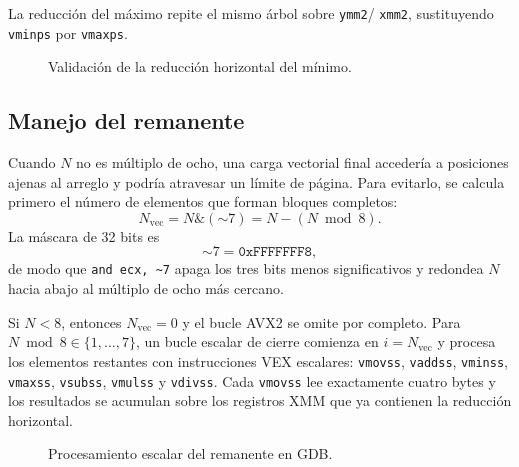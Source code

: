 \documentclass[journal]{IEEEtran}
\begin{document}
La reducción del máximo repite el mismo árbol sobre \texttt{ymm2}/
\texttt{xmm2}, sustituyendo \texttt{vminps} por \texttt{vmaxps}.

\begin{figure}[H]
  \centering
  \caption{Validación de la reducción horizontal del mínimo.}
  \label{fig:gdb-reduccion-min}
\end{figure}

\subsection{Manejo del remanente}

Cuando $N$ no es múltiplo de ocho, una carga vectorial final accedería a
posiciones ajenas al arreglo y podría atravesar un límite de página. Para
evitarlo, se calcula primero el número de elementos que forman bloques
completos:
\begin{equation}
  N_{\mathrm{vec}}=N\mathbin{\&}(\mathord{\sim}7)
  =N-(N\bmod 8).
  \label{eq:n-vector-limit}
\end{equation}
La máscara de 32 bits es
\begin{equation}
  \mathord{\sim}7=\texttt{0xFFFFFFF8},
  \label{eq:tail-mask}
\end{equation}
de modo que \texttt{and ecx, \textasciitilde 7} apaga los tres bits menos
significativos y redondea $N$ hacia abajo al múltiplo de ocho más cercano.

Si $N<8$, entonces $N_{\mathrm{vec}}=0$ y el bucle AVX2 se omite por completo.
Para $N\bmod8\in\{1,\ldots,7\}$, un bucle escalar de cierre comienza en
$i=N_{\mathrm{vec}}$ y procesa los elementos restantes con instrucciones VEX
escalares: \texttt{vmovss}, \texttt{vaddss}, \texttt{vminss},
\texttt{vmaxss}, \texttt{vsubss}, \texttt{vmulss} y \texttt{vdivss}. Cada
\texttt{vmovss} lee exactamente cuatro bytes y los resultados se acumulan sobre
los registros XMM que ya contienen la reducción horizontal.

\begin{figure}[H]
  \centering
  \caption{Procesamiento escalar del remanente en GDB.}
  \label{fig:gdb-tail-loop}
\end{figure}
\end{document}
